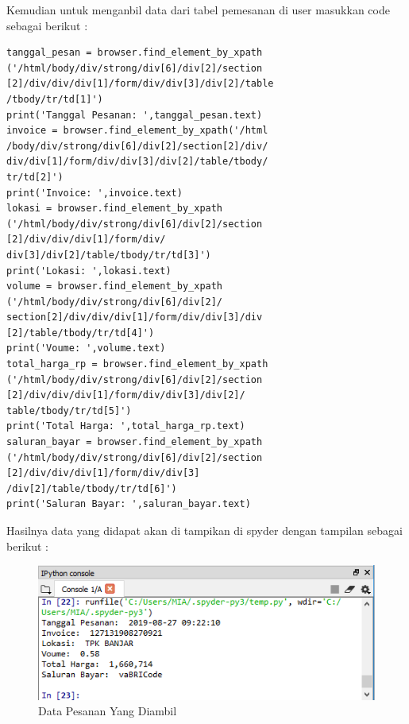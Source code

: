 Kemudian untuk menganbil data dari tabel pemesanan di user masukkan code sebagai berikut :
\begin{verbatim}
tanggal_pesan = browser.find_element_by_xpath
('/html/body/div/strong/div[6]/div[2]/section
[2]/div/div/div[1]/form/div/div[3]/div[2]/table
/tbody/tr/td[1]')
print('Tanggal Pesanan: ',tanggal_pesan.text)
invoice = browser.find_element_by_xpath('/html
/body/div/strong/div[6]/div[2]/section[2]/div/
div/div[1]/form/div/div[3]/div[2]/table/tbody/
tr/td[2]')
print('Invoice: ',invoice.text)
lokasi = browser.find_element_by_xpath
('/html/body/div/strong/div[6]/div[2]/section
[2]/div/div/div[1]/form/div/
div[3]/div[2]/table/tbody/tr/td[3]')
print('Lokasi: ',lokasi.text)
volume = browser.find_element_by_xpath
('/html/body/div/strong/div[6]/div[2]/
section[2]/div/div/div[1]/form/div/div[3]/div
[2]/table/tbody/tr/td[4]')
print('Voume: ',volume.text)
total_harga_rp = browser.find_element_by_xpath
('/html/body/div/strong/div[6]/div[2]/section
[2]/div/div/div[1]/form/div/div[3]/div[2]/
table/tbody/tr/td[5]')
print('Total Harga: ',total_harga_rp.text)
saluran_bayar = browser.find_element_by_xpath
('/html/body/div/strong/div[6]/div[2]/section
[2]/div/div/div[1]/form/div/div[3]
/div[2]/table/tbody/tr/td[6]')
print('Saluran Bayar: ',saluran_bayar.text)
\end{verbatim}
Hasilnya data yang didapat akan di tampikan di spyder dengan tampilan sebagai berikut :
\begin{figure}[h]
	\centering
	\includegraphics[scale=0.6]{figures/mengambildatapesanan}
	\caption{Data Pesanan Yang Diambil}
\end{figure}